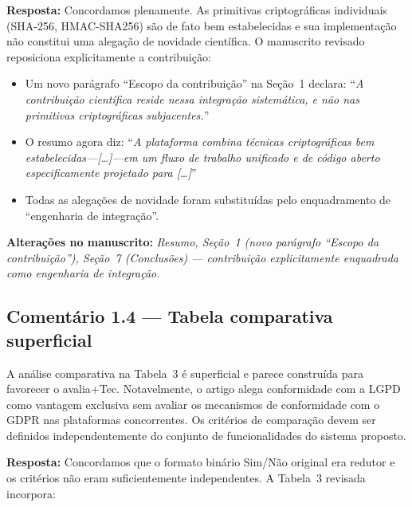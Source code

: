 \documentclass[11pt,a4paper]{article}
\newcommand{\response}[1]{\par\noindent\textcolor{responsecolor}{\textbf{Resposta:}} #1}
\newcommand{\change}[1]{\par\noindent\textcolor{changecolor}{\textbf{Alterações no manuscrito:}} \textit{#1}}
\begin{document}
\response{Concordamos plenamente. As primitivas criptográficas individuais (SHA-256, HMAC-SHA256) são de fato bem estabelecidas e sua implementação não constitui uma alegação de novidade científica. O manuscrito revisado reposiciona explicitamente a contribuição:}

\begin{itemize}[nosep]
  \item Um novo parágrafo ``Escopo da contribuição'' na Seção~1 declara: ``\textit{A contribuição científica reside nessa integração sistemática, e não nas primitivas criptográficas subjacentes.}''
  \item O resumo agora diz: ``\textit{A plataforma combina técnicas criptográficas bem estabelecidas---[\ldots]---em um fluxo de trabalho unificado e de código aberto especificamente projetado para [\ldots]}''
  \item Todas as alegações de novidade foram substituídas pelo enquadramento de ``engenharia de integração''.
\end{itemize}

\change{Resumo, Seção~1 (novo parágrafo ``Escopo da contribuição''), Seção~7 (Conclusões) --- contribuição explicitamente enquadrada como engenharia de integração.}

\bigskip

\subsection*{Comentário 1.4 --- Tabela comparativa superficial}

\begin{reviewerbox}
A análise comparativa na Tabela~3 é superficial e parece construída para favorecer o avalia+Tec. Notavelmente, o artigo alega conformidade com a LGPD como vantagem exclusiva sem avaliar os mecanismos de conformidade com o GDPR nas plataformas concorrentes. Os critérios de comparação devem ser definidos independentemente do conjunto de funcionalidades do sistema proposto.
\end{reviewerbox}

\response{Concordamos que o formato binário Sim/Não original era redutor e os critérios não eram suficientemente independentes. A Tabela~3 revisada incorpora:}
\end{document}
